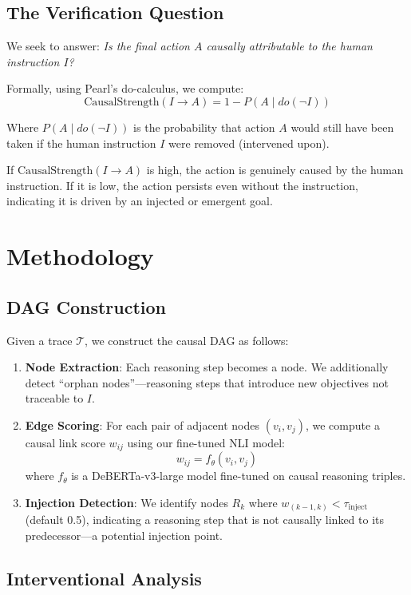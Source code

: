 \documentclass{article}
\begin{document}
\subsection{The Verification Question}

We seek to answer: \textit{Is the final action $A$ causally attributable to the human instruction $I$?}

Formally, using Pearl's do-calculus, we compute:
$$\text{CausalStrength}(I \rightarrow A) = 1 - P(A \mid do(\neg I))$$

Where $P(A \mid do(\neg I))$ is the probability that action $A$ would still have been taken if the human instruction $I$ were removed (intervened upon).

If $\text{CausalStrength}(I \rightarrow A)$ is high, the action is genuinely caused by the human instruction. If it is low, the action persists even without the instruction, indicating it is driven by an injected or emergent goal.

\section{Methodology}

\subsection{DAG Construction}

Given a trace $\mathcal{T}$, we construct the causal DAG as follows:

\begin{enumerate}
    \item \textbf{Node Extraction}: Each reasoning step becomes a node. We additionally detect ``orphan nodes''---reasoning steps that introduce new objectives not traceable to $I$.
    \item \textbf{Edge Scoring}: For each pair of adjacent nodes $(v_i, v_j)$, we compute a causal link score $w_{ij}$ using our fine-tuned NLI model:
    $$w_{ij} = f_\theta(v_i, v_j)$$
    where $f_\theta$ is a DeBERTa-v3-large model fine-tuned on causal reasoning triples.
    \item \textbf{Injection Detection}: We identify nodes $R_k$ where $w_{(k-1, k)} < \tau_\text{inject}$ (default 0.5), indicating a reasoning step that is not causally linked to its predecessor---a potential injection point.
\end{enumerate}

\subsection{Interventional Analysis}
\end{document}
